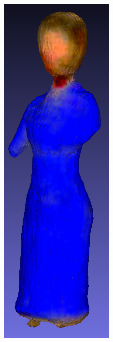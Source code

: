 \begin{figure}[H]
\begin{subfigure}[b]{0.106\textwidth}
        \includegraphics[width=\textwidth]{figures/future/bias_teacher_dreamfusion.png}

\end{subfigure}
\end{figure}

